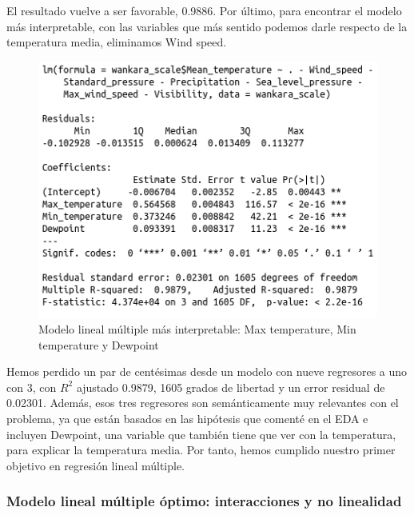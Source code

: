 El resultado vuelve a ser favorable, 0.9886. Por último, para encontrar el modelo más interpretable, con las variables que más sentido podemos darle respecto de la temperatura media, eliminamos Wind speed.

\begin{figure}[H] %
	\centering
	\includegraphics[scale=0.6]{mlm7.png}  %
	\caption{Modelo lineal múltiple más interpretable: Max temperature, Min temperature y Dewpoint} 
	\label{fig:mlm7}
\end{figure}

Hemos perdido un par de centésimas desde un modelo con nueve regresores a uno con 3, con $R^2$ ajustado 0.9879, 1605 grados de libertad y un error residual de 0.02301. Además, esos tres regresores son semánticamente muy relevantes con el problema, ya que están basados en las hipótesis que comenté en el EDA e incluyen Dewpoint, una variable que también tiene que ver con la temperatura, para explicar la temperatura media. Por tanto, hemos cumplido nuestro primer objetivo en regresión lineal múltiple.

\subsubsection{Modelo lineal múltiple óptimo: interacciones y no linealidad}

